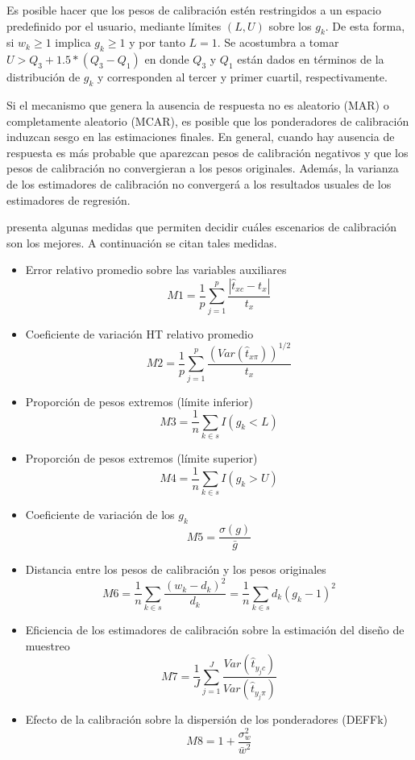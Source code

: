 \documentclass[
  10pt,
  spanish,
]{book}
\begin{document}
Es posible hacer que los pesos de calibración estén restringidos a un espacio predefinido por el usuario, mediante límites \((L, U)\) sobre los \(g_k\). De esta forma, si \(w_k \geq 1\) implica \(g_k \geq 1\) y por tanto \(L=1\). Se acostumbra a tomar \(U > Q_3 + 1.5 * (Q_3 - Q_1)\) en donde \(Q_3\) y \(Q_1\) están dados en términos de la distribución de \(g_k\) y corresponden al tercer y primer cuartil, respectivamente.

Si el mecanismo que genera la ausencia de respuesta no es aleatorio (MAR) o completamente aleatorio (MCAR), es posible que los ponderadores de calibración induzcan sesgo en las estimaciones finales. En general, cuando hay ausencia de respuesta es más probable que aparezcan pesos de calibración negativos y que los pesos de calibración no convergieran a los pesos originales. Además, la varianza de los estimadores de calibración no convergerá a los resultados usuales de los estimadores de regresión.

\citet{Silva_2004} presenta algunas medidas que permiten decidir cuáles escenarios de calibración son los mejores. A continuación se citan tales medidas.

\begin{itemize}
\item
  Error relativo promedio sobre las variables auxiliares
  \[
  M1= \frac{1}{p} \sum_{j=1}^p \frac{|\hat{t}_{xc} - t_x|}{t_x}
  \]
\item
  Coeficiente de variación HT relativo promedio
  \[M2= \frac{1}{p} \sum_{j=1}^p \frac{(Var(\hat{t}_{x\pi}))^{1/2}}{t_x} \]
\item
  Proporción de pesos extremos (límite inferior)
  \[M3 = \frac{1}{n} \sum_{k \in s}I(g_k<L)\]
\item
  Proporción de pesos extremos (límite superior)
  \[M4= \frac{1}{n} \sum_{k \in s}I(g_k>U)\]
\item
  Coeficiente de variación de los \(g_k\)
  \[M5= \frac{\sigma(g)}{\bar{g}}\]
\item
  Distancia entre los pesos de calibración y los pesos originales
  \[M6 = \frac{1}{n}\sum_{k \in s} \frac{(w_k - d_k)^2}{d_k}
  = \frac{1}{n}\sum_{k \in s} d_k(g_k - 1)^2\]
\item
  Eficiencia de los estimadores de calibración sobre la estimación del diseño de muestreo
  \[M7 = \frac{1}{J}\sum_{j=1}^J \frac{Var(\hat{t}_{y_jc})}{Var(\hat{t}_{y_j\pi})} \]
\item
  Efecto de la calibración sobre la dispersión de los ponderadores (DEFFk)
  \[M8 = 1+\frac{\sigma^2_w}{\bar{w}^2}\]
\end{itemize}
\end{document}
